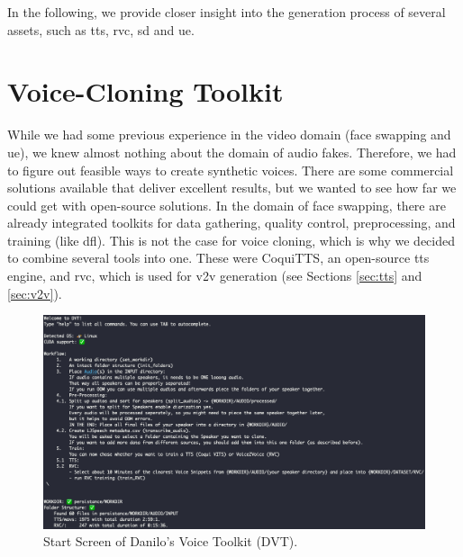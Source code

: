 \documentclass[
  a4paper,  %
  twoside,  %
  bibliography=totoc,
  headsepline,
  cleardoublepage=empty,
  parskip=half,
  draft=false
]{scrbook}
\begin{document}
In the following, we provide closer insight into the generation process of several assets, such as \gls{tts}, \gls{rvc}, \gls{sd} and \gls{ue}.

\section{Voice-Cloning Toolkit}
\label{sec:dvt}
While we had some previous experience in the video domain (face swapping and \gls{ue}), we knew almost nothing about the domain of audio fakes. Therefore, we had to figure out feasible ways to create synthetic voices. There are some commercial solutions available that deliver excellent results, but we wanted to see how far we could get with open-source solutions. In the domain of face swapping, there are already integrated toolkits for data gathering, quality control, preprocessing, and training (like \gls{dfl}). This is not the case for voice cloning, which is why we decided to combine several tools into one. These were CoquiTTS, an open-source \gls{tts} engine, and \gls{rvc}, which is used for \gls{v2v} generation (see Sections \ref{sec:tts} and \ref{sec:v2v}). 

\begin{figure}[h]
  \centering
  \includegraphics[width=1\textwidth]{./graphics/dvt-screen.png}
  \caption{Start Screen of Danilo's Voice Toolkit (DVT).}
  \label{fig:dvt-interface}
\end{figure}
\end{document}
